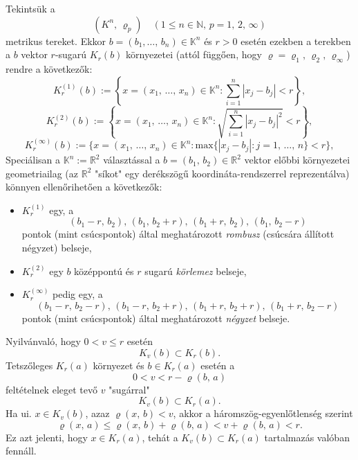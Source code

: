 \documentclass[12pt]{article}
\newcommand{\R}{\mathbb{R}}
\newcommand{\N}{\mathbb{N}}
\newcommand{\K}{\mathbb{K}}
\begin{document}
    Tekintsük a
    \[
        (K^n, \, \varrho_p) \quad (1 \leq n \in \N, \, p = 1, \, 2, \, \infty)
    \]
    metrikus tereket. Ekkor $b = (b_1, \dots, \, b_n) \in \K^n$ és $r > 0$ esetén ezekben a terekben a $b$ vektor $r$-sugarú $K_r(b)$ környezetei (attól függően, hogy $\varrho = \varrho_1, \, \varrho_2, \, \varrho_\infty$) rendre a következők:
    \[
        K_r^{(1)}(b) := \left\{ x = (x_1, \, \dots, \, x_n) \in \K^n : \sum_{i=1}^n |x_j - b_j| < r \right\},
    \]
    \[
        K_r^{(2)}(b) := \left\{ x = (x_1, \, \dots, \, x_n) \in \K^n : \sqrt{\sum_{i=1}^n |x_j - b_j|^2} < r \right\},
    \]
    \[
        K_r^{(\infty)}(b) := \Bigg\{ x = (x_1, \, \dots, \, x_n) \in \K^n : \text{max}\{|x_j - b_j| : j = 1, \, \dots, \, n\} < r \Bigg\},
    \]
    Speciálisan a $\K^n := \R^2$ választással a $b = (b_1, \, b_2) \in \R^2$ vektor előbbi környezetei geometriailag (az $\R^2$ "síkot" egy derékszögű koordináta-rendszerrel reprezentálva) könnyen ellenőrihetően a következők:
    \begin{itemize}
        \item $K_r^{(1)}$ egy, a
        \[
            (b_1 - r, \, b_2), \, (b_1, \, b_2 + r), \, (b_1 + r, \, b_2), \, (b_1, \, b_2 - r)
        \]
        pontok (mint csúcspontok) által meghatározott \textit{rombusz} (csúcsára állított négyzet) belseje,
        \item $K_r^{(2)}$ egy $b$ középpontú és $r$ sugarú \textit{körlemez} belseje,
        \item $K_r^{(\infty)}$ pedig egy, a
        \[
            (b_1 - r, \, b_2 - r), \, (b_1 - r, \, b_2 + r), \, (b_1 + r, \, b_2 + r), \, (b_1 + r, \, b_2 - r)
        \]
        pontok (mint csúcspontok) által meghatározott \textit{négyzet} belseje.
    \end{itemize}
    
    Nyilvánvaló, hogy $0 < v \leq r$ esetén
    \[
        K_v(b) \subset K_r(b).
    \]
    Tetszőleges $K_r(a)$ környezet és $b \in K_r(a)$ esetén a
    \[
        0 < v < r - \varrho(b, \, a)
    \]
    feltételnek eleget tevő $v$ "sugárral"
    \[
        K_v(b) \subset K_r(a).
    \]
    Ha ui. $x \in K_v(b)$, azaz $\varrho(x, \, b) < v$, akkor a háromszög-egyenlőtlenség szerint
    \[
        \varrho(x, \, a) \leq \varrho(x, \, b) + \varrho(b, \, a) < v + \varrho(b, \, a) < r.
    \]
    Ez azt jelenti, hogy $x \in K_r(a)$, tehát a $K_v(b) \subset K_r(a)$ tartalmazás valóban fennáll.\\
\end{document}
